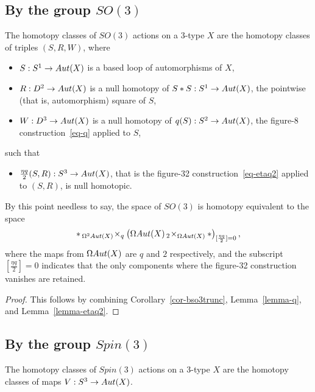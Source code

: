 \documentclass{amsart}
\begin{document}

\subsection{By the group $SO(3)$}

\begin{theorem} \label{thm-so3action}
The homotopy classes of $SO(3)$ actions on a 3-type $X$ are the homotopy classes of triples $(S,R,W)$, where 
\begin{itemize}
\item $S: S^1 \rightarrow Aut(X)$ is a based loop of automorphisms of $X$,
\item $R: D^2 \rightarrow Aut(X)$ is a null homotopy of $S \ast S: S^1 \rightarrow Aut(X)$, the pointwise (that is, automorphism) square of $S$,
\item $W: D^3 \rightarrow Aut(X)$ is a null homotopy of $q(S): S^2 \rightarrow Aut(X)$, the figure-8 construction~\eqref{eq-q} applied to $S$,
\end{itemize}
such that
\begin{itemize}
\item $\frac{\eta q}{2} (S,R) : S^3 \rightarrow Aut(X)$, that is the figure-32 construction~\eqref{eq-etaq2} applied to $(S,R)$, is null homotopic.
\end{itemize}
\end{theorem}
\nid By this point needless to say, the space of $SO(3)$ is homotopy equivalent to the space
\begin{equation} \nonumber
\ast \,_{\Omega^2 Aut(X)}\! \times_q \left(\Omega Aut(X) \,_2\! \times_{\Omega Aut(X)} \ast\right)_{[\frac{\eta q}{2}]=0},
\end{equation}
where the maps from $\Omega Aut(X)$ are $q$ and $2$ respectively, and the subscript $[\frac{\eta q}{2}]=0$ indicates that the only components where the figure-32 construction vanishes are retained.
\begin{proof}
This follows by combining Corollary~\ref{cor-bso3trunc}, Lemma~\ref{lemma-q}, and Lemma~\ref{lemma-etaq2}.
\end{proof}

\subsection{By the group $Spin(3)$}

\begin{prop}
The homotopy classes of $Spin(3)$ actions on a 3-type $X$ are the homotopy classes of maps $V: S^3 \rightarrow Aut(X)$.
\end{prop}
\end{document}
